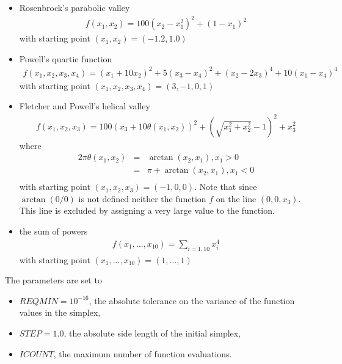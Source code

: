 \begin{itemize}
\item Rosenbrock's parabolic valley \cite{citeulike:1903787}
\begin{eqnarray}
\label{nm-oneill-rosenbrock}
f(x_1,x_2) = 100(x_2 - x_1^2)^2 + (1-x_1)^2
\end{eqnarray}
with starting point $(x_1,x_2) = (-1.2,1.0)$
\item Powell's quartic function \cite{Powell08011962}
\begin{eqnarray}
\label{nm-oneill-powell}
f(x_1,x_2,x_3,x_4) = (x_1 + 10x_2)^2 + 5 ( x_3 - x_4)^2 + (x_2 - 2x_3)^4 + 10 (x_1 - x_4)^4
\end{eqnarray}
with starting point $(x_1,x_2,x_3,x_4) = (3,-1,0,1)$
\item Fletcher and Powell's helical valley \cite{R.Fletcher08011963}
\begin{eqnarray}
\label{nm-oneill-fletcherpowell}
f(x_1,x_2,x_3) = 100\left(x_3 + 10\theta(x_1,x_2)\right)^2 
+ \left(\sqrt{x_1^2 + x_2^2} - 1\right)^2  + x_3^2
\end{eqnarray}
where 
\begin{eqnarray}
\label{nm-oneill-fletcherpowelltheta}
2\pi \theta(x_1,x_2) &=& \arctan(x_2,x_1), x_1>0\\
&=& \pi + \arctan(x_2,x_1), x_1<0\\
\end{eqnarray}
with starting point $(x_1,x_2,x_3) = (-1,0,0)$. Note
that since $\arctan(0/0)$ is not defined neither 
the function $f$ on the line $(0,0,x_3)$. This line is excluded 
by assigning a very large value to the function.
\item the sum of powers 
\begin{eqnarray}
\label{nm-oneill-powers}
f(x_1,\ldots,x_{10}) = \sum_{i=1,10} x_i^4
\end{eqnarray}
with starting point $(x_1,\ldots,x_{10}) = (1,\ldots,1)$
\end{itemize}

The parameters are set to 

\begin{itemize}
\item $REQMIN=10^{-16}$, the absolute tolerance on the variance of the function 
values in the simplex,
\item $STEP = 1.0$, the absolute side length of the initial simplex,
\item $ICOUNT$, the maximum number of function evaluations.
\end{itemize}

